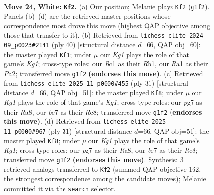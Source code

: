 \documentclass[11pt]{article}
\begin{document}
\clearpage

\begin{figure}[p]\centering
\begin{subfigure}{0.46\textwidth}\centering
\resizebox{\linewidth}{!}{%
\newchessgame
\chessboard[
  setfen={rn2kr2/1p2b1pp/p3b3/3pPp1P/8/P5P1/4N3/RNB2RK1 w - - 0 24},
  showmover=false,
  pgfstyle=straightmove, color=movearrow, markmove={g1-f2}
]}
\caption{}
\end{subfigure}\hfill
\begin{subfigure}{0.46\textwidth}\centering
\resizebox{\linewidth}{!}{%
\newchessgame
\chessboard[
  setfen={r2r2k1/5p2/4bp1p/pB1pb3/8/7P/P1P1NPP1/1R1R2K1 w - - 1 21},
  showmover=false,
  pgfstyle=straightmove, color=movearrow, markmove={g1-f1}
]}
\caption{}
\end{subfigure}
\\[4pt]
\begin{subfigure}{0.46\textwidth}\centering
\resizebox{\linewidth}{!}{%
\newchessgame
\chessboard[
  setfen={r1r3k1/pp1b1pp1/5n1p/2Pp4/8/1NP1PP2/P5PP/3RKB1R b K - 2 16},
  showmover=false,
  pgfstyle=straightmove, color=movearrow, markmove={g8-f8}
]}
\caption{}
\end{subfigure}\hfill
\begin{subfigure}{0.46\textwidth}\centering
\resizebox{\linewidth}{!}{%
\newchessgame
\chessboard[
  setfen={r1r3k1/pp1b1pp1/5n1p/2Pp4/8/1NP1PP2/P5PP/3RKB1R b K - 0 16},
  showmover=false,
  pgfstyle=straightmove, color=movearrow, markmove={g8-f8}
]}
\caption{}
\end{subfigure}
\caption{\textbf{Move 24, White: \texttt{Kf2}.} (a) Our position; Melanie plays \texttt{Kf2} (\texttt{g1f2}). Panels (b)--(d) are the retrieved master positions whose correspondence most drove this move (highest QAP objective among those that transfer to it). (b) Retrieved from \texttt{lichess\_elite\_2024-09\_p0023\#2141} (ply 40) [structural distance $d$=66, QAP obj=60]: the master played \texttt{Kf1}; under $\mu$ our \emph{Kg1} plays the role of that game's \emph{Kg1}; cross-type roles: our \emph{B}c1 as their \emph{R}b1, our \emph{R}a1 as their \emph{P}a2; transferred move \texttt{g1f2} \textbf{(endorses this move)}. (c) Retrieved from \texttt{lichess\_elite\_2025-11\_p0000\#455} (ply 31) [structural distance $d$=66, QAP obj=51]: the master played \texttt{Kf8}; under $\mu$ our \emph{Kg1} plays the role of that game's \emph{Kg1}; cross-type roles: our \emph{p}g7 as their \emph{R}a8, our \emph{b}e7 as their \emph{R}c8; transferred move \texttt{g1f2} \textbf{(endorses this move)}. (d) Retrieved from \texttt{lichess\_elite\_2025-11\_p0000\#967} (ply 31) [structural distance $d$=66, QAP obj=51]: the master played \texttt{Kf8}; under $\mu$ our \emph{Kg1} plays the role of that game's \emph{Kg1}; cross-type roles: our \emph{p}g7 as their \emph{R}a8, our \emph{b}e7 as their \emph{R}c8; transferred move \texttt{g1f2} \textbf{(endorses this move)}. Synthesis: 3 retrieved analogs transferred to \texttt{Kf2} (summed QAP objective 162, the strongest correspondence among the candidate moves); Melanie committed it via the \texttt{search} selector.}
\label{fig:thought-m46}
\end{figure}
\end{document}
